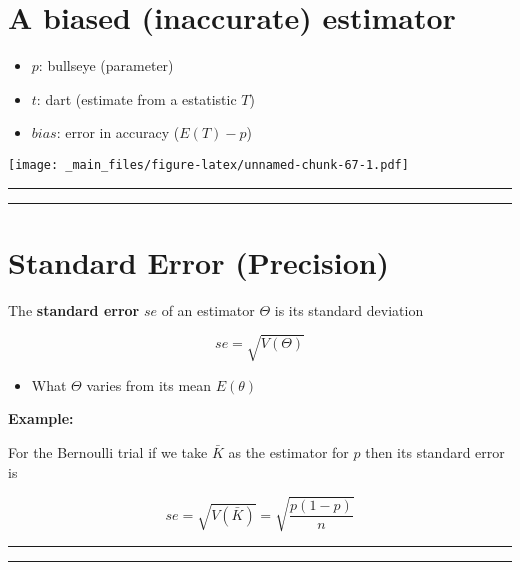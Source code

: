 \documentclass[
]{book}
\providecommand{\tightlist}{%
  \setlength{\itemsep}{0pt}\setlength{\parskip}{0pt}}
\begin{document}
\hypertarget{a-biased-inaccurate-estimator}{%
\section{A biased (inaccurate) estimator}\label{a-biased-inaccurate-estimator}}

\begin{itemize}
\tightlist
\item
  \(p\): bullseye (parameter)
\item
  \(t\): dart (estimate from a estatistic \(T\))
\item
  \(bias\): error in accuracy (\(E(T)-p\))
\end{itemize}

\texttt{[image: \_main\_files/figure-latex/unnamed-chunk-67-1.pdf]}

\begin{center}\rule{0.5\linewidth}{0.5pt}\end{center}

\begin{center}\rule{0.5\linewidth}{0.5pt}\end{center}

\hypertarget{standard-error-precision}{%
\section{Standard Error (Precision)}\label{standard-error-precision}}

The \textbf{standard error} \(se\) of an estimator \(\Theta\) is its standard deviation

\[se=\sqrt{V(\Theta)}\]

\begin{itemize}
\tightlist
\item
  What \(\Theta\) varies from its mean \(E(\theta)\)
\end{itemize}

\textbf{Example:}

For the Bernoulli trial if we take \(\bar{K}\) as the estimator for \(p\) then its standard error is

\[se=\sqrt{V(\bar{K})}= \sqrt{\frac{p(1-p)}{n}}\]

\begin{center}\rule{0.5\linewidth}{0.5pt}\end{center}

\begin{center}\rule{0.5\linewidth}{0.5pt}\end{center}
\end{document}
